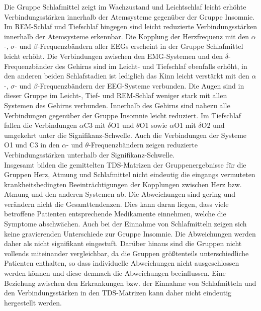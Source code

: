 Die Gruppe Schlafmittel zeigt im Wachzustand und Leichtschlaf leicht erhöhte Verbindungsstärken innerhalb der Atemsysteme gegenüber der Gruppe Insomnie. Im \acs{REM}-Schlaf und Tiefschlaf hingegen sind leicht reduzierte Verbindungsstärken innerhalb der Atemsysteme erkennbar. Die Kopplung der Herzfrequenz mit den $\alpha$-, $\sigma$- und $\beta$-Frequenzbändern aller \acs{EEG}s erscheint in der Gruppe Schlafmittel leicht erhöht. Die Verbindungen zwischen den \acs{EMG}-Systemen und den $\delta$-Frequenzbänder des Gehirns sind im Leicht- und Tiefschlaf ebenfalls erhöht, in den anderen beiden Schlafstadien ist lediglich das Kinn leicht verstärkt mit den $\alpha$-, $\sigma$- und $\beta$-Frequenzbändern der \acs{EEG}-Systeme verbunden. Die Augen sind in dieser Gruppe im Leicht-, Tief- und \acs{REM}-Schlaf weniger stark mit allen Systemen des Gehirns verbunden. Innerhalb des Gehirns sind nahezu alle Verbindungen gegenüber der Gruppe Insomnie leicht reduziert. Im Tiefschlaf fallen die Verbindungen $\alpha$C3 mit $\delta$O1 und $\theta$O1 sowie $\alpha$O1 mit $\delta$O2 und umgekehrt unter die Signifikanz-Schwelle. Auch die Verbindungen der Systeme O1 und C3 in den $\alpha$- und $\theta$-Frequenzbändern zeigen reduzierte Verbindungsstärken unterhalb der Signifikanz-Schwelle.\\

Insgesamt bilden die gemittelten \acs{TDS}-Matrizen der Gruppenergebnisse für die Gruppen Herz, Atmung und Schlafmittel nicht eindeutig die eingangs vermuteten krankheitsbedingten Beeinträchtigungen der Kopplungen zwischen Herz bzw. Atmung und den anderen Systemen ab. Die Abweichungen sind gering und verändern nicht die Gesamttendenzen. Dies kann daran liegen, dass viele betroffene Patienten entsprechende Medikamente einnehmen, welche die Symptome abschwächen. Auch bei der Einnahme von Schlafmitteln zeigen sich keine gravierenden Unterschiede zur Gruppe Insomnie. Die Abweichungen werden daher als nicht signifikant eingestuft. Darüber hinaus sind die Gruppen nicht vollends miteinander vergleichbar, da die Gruppen größtenteils unterschiedliche Patienten enthalten, so dass individuelle Abweichungen nicht ausgeschlossen werden können und diese demnach die Abweichungen beeinflussen. Eine Beziehung zwischen den Erkrankungen bzw. der Einnahme von Schlafmitteln und den Verbindungsstärken in den \acs{TDS}-Matrizen kann daher nicht eindeutig hergestellt werden. \\

